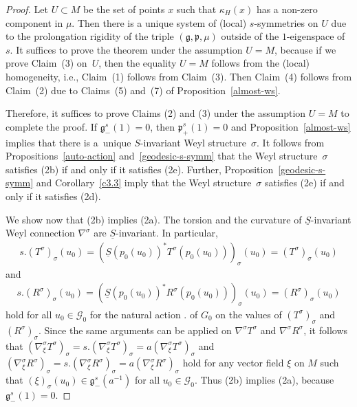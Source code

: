 \documentclass[pdftex]{sigma}
\newcommand{\si}{\sigma}
\newcommand{\un}{\underline}
\newcommand{\ba}{\mathcal{G}}
\newcommand{\fg}{\mathfrak g}
\newcommand{\fp}{\mathfrak p}
\numberwithin{equation}{section}
\begin{document}
\begin{proof}
Let $U\subset M$ be the set of points $x$ such that $\kappa_H(x)$ has a non-zero component in $\mu$. Then there is a unique system of (local) $s$-symmetries on $U$ due to the prolongation rigidity of the triple $(\fg,\fp,\mu)$ outside of the $1$-eigenspace of~$s$. It suf\/f\/ices to prove the theorem under the assumption $U=M$, because if we prove Claim~(3) on~$U$, then the equality $U=M$ follows from the (local) homogeneity, i.e., Claim~(1) follows from Claim~(3). Then Claim~(4) follows from Claim~(2) due to Claims~(5) and~(7) of Proposition~\ref{almost-ws}.

Therefore, it suf\/f\/ices to prove Claims (2) and (3) under the assumption $U=M$ to complete the proof. If $\fg^s_-(1)=0$, then $\fp^s_+(1)=0$ and Proposition~\ref{almost-ws} implies that there is a~unique $S$-invariant Weyl structu\-re~$\si$. It follows from Propositions~\ref{auto-action} and~\ref{geodesic-s-symm} that the Weyl structure~$\si$ satisf\/ies (2b) if and only if it satisf\/ies (2e). Further, Proposition~\ref{geodesic-s-symm} and Corollary~\ref{c3.3} imply that the Weyl structure~$\si$ satisf\/ies (2e) if and only if it satisf\/ies (2d).

We show now that (2b) implies (2a). The torsion and the curvature of $\un S$-invariant Weyl connection $\nabla^\si$ are $\un S$-invariant. In particular, \begin{gather*}s.(T^\si)_\si(u_0)=(\un S(p_0(u_0))^*T^\si(p_0(u_0)))_\si(u_0)=(T^\si)_\si(u_0)\end{gather*} and \begin{gather*}s.(R^\si)_\si(u_0)=(\un S(p_0(u_0))^*R^\si(p_0(u_0)))_\si(u_0)=(R^\si)_\si(u_0)\end{gather*} hold for all $u_0\in \ba_0$ for the natural action $.$ of $G_0$ on the values of $(T^\si)_\si$ and $(R^\si)_\si$. Since the same arguments can be applied on $\nabla^\si T^\si$ and $\nabla^\si R^\si$, it follows that $(\nabla^\si_\xi T^\si)_\si=s.(\nabla^\si_\xi T^\si)_\si=a(\nabla^\si_\xi T^\si)_\si$ and $(\nabla^\si_\xi R^\si)_\si=s.(\nabla^\si_\xi R^\si)_\si=a(\nabla^\si_\xi R^\si)_\si$ hold for any vector f\/ield $\xi$ on $M$ such that $(\xi)_\si(u_0) \in \fg^s_-(a^{-1})$ for all $u_0\in \ba_0$. Thus (2b) implies (2a), because $\fg^s_-(1)=0$.


\end{proof}
\end{document}
